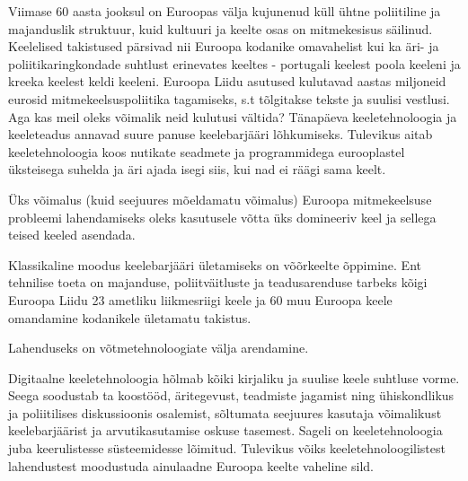 \begin{multicols}{2}
Viimase 60 aasta jooksul on Euroopas välja kujunenud küll ühtne poliitiline ja majanduslik struktuur, kuid kul\-tuuri ja keelte osas on mitme\-kesisus säilinud. 
Keelelised takistused pärsivad nii Euroopa kodanike omavahelist kui ka äri- ja poliitikaringkondade suhtlust erinevates keeltes - portugali keelest poola keeleni ja kreeka keelest keldi keeleni.
Euroopa Lii\-du asutused kulutavad aastas miljoneid eurosid mitmekeelsuspoliitika tagamiseks, s.t tõlgitakse tekste ja suulisi vestlusi. 
Aga kas meil oleks võimalik neid kulutusi vältida?
Tänapäeva keeletehnoloogia ja keeleteadus annavad suure panuse keelebarjääri lõhkumiseks. 
Tulevikus aitab keeletehno\-loogia koos nutikate seadmete ja programmidega eurooplastel üks\-teisega suhelda ja äri ajada isegi siis, kui nad ei räägi sama keelt.


Üks võimalus (kuid seejuures mõeldamatu võimalus) Euroopa mitmekeelsuse probleemi lahendamiseks oleks kasutusele võtta üks domineeriv keel ja sellega teised keeled asendada. 

Klassikaline moodus keelebarjääri ületamiseks on võõrkeelte õppimine. 
Ent tehnilise toeta on majanduse, poliitväitluste ja teadusarenduse tarbeks kõigi Euroopa Liidu 23 ametliku liikmesriigi keele ja 60 muu Euroopa keele omandamine kodanikele ületamatu takistus.

Lahenduseks on võtmetehnoloogiate välja arendamine. 

Digitaalne keeletehnoloogia hõlmab kõiki kirjaliku ja suulise keele suhtluse vorme. 
Seega soodustab ta koostööd, äritegevust, teadmiste jagamist ning ühiskondlikus ja poliitilises diskussioonis osalemist, sõltumata seejuures kasutaja võimalikust keelebarjäärist ja arvutikasutamise oskuse tasemest.
Sageli on keeletehno\-loogia juba keerulistesse süsteemi\-desse lõimitud.
Tulevikus võiks keeletehnoloogilistest lahendustest moodustuda ainulaadne Euroopa keelte vaheline sild.


\end{multicols}
